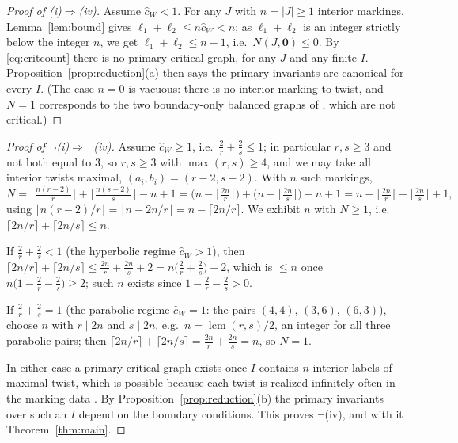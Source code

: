 \documentclass[11pt]{amsart}
\theoremstyle{definition}
\theoremstyle{remark}
\newcommand{\chat}{\hat{c}}
\begin{document}
\begin{proof}[Proof of (i)$\Rightarrow$(iv)]
Assume $\chat_{W}<1$. For any $J$ with $n=|J|\geq1$ interior markings,
Lemma~\ref{lem:bound} gives $\ell_{1}+\ell_{2}\leq n\chat_{W}<n$; as
$\ell_{1}+\ell_{2}$ is an integer strictly below the integer $n$, we get
$\ell_{1}+\ell_{2}\leq n-1$, i.e.\ $N(J,\mathbf 0)\leq0$. By
\eqref{eq:critcount} there is no primary critical graph, for any $J$ and any
finite $I$. Proposition~\ref{prop:reduction}(a) then says the primary invariants
are canonical for every $I$. (The case $n=0$ is vacuous: there is no interior
marking to twist, and $N=1$ corresponds to the two boundary-only balanced graphs
of \cite[Example~3.4]{GKT}, which are not critical.)
\end{proof}

\begin{proof}[Proof of $\neg$(i)$\Rightarrow\neg$(iv)]
Assume $\chat_{W}\geq1$, i.e.\ $\frac2r+\frac2s\leq1$; in particular
$r,s\geq3$ and not both equal to $3$, so $r,s\geq3$ with $\max(r,s)\geq4$, and
we may take all interior twists maximal, $(a_{i},b_{i})=(r-2,s-2)$. With $n$ such
markings,
\begin{equation}
\label{eq:maxN}
N=\Big\lfloor\tfrac{n(r-2)}{r}\Big\rfloor+\Big\lfloor\tfrac{n(s-2)}{s}\Big\rfloor-n+1
=\Big(n-\big\lceil\tfrac{2n}{r}\big\rceil\Big)
+\Big(n-\big\lceil\tfrac{2n}{s}\big\rceil\Big)-n+1
=n-\big\lceil\tfrac{2n}{r}\big\rceil-\big\lceil\tfrac{2n}{s}\big\rceil+1,
\end{equation}
using $\lfloor n(r-2)/r\rfloor=\lfloor n-2n/r\rfloor=n-\lceil2n/r\rceil$. We
exhibit $n$ with $N\geq1$, i.e.\ $\lceil2n/r\rceil+\lceil2n/s\rceil\leq n$.

If $\frac2r+\frac2s<1$ (the hyperbolic regime $\chat_{W}>1$), then
$\lceil2n/r\rceil+\lceil2n/s\rceil\leq\frac{2n}{r}+\frac{2n}{s}+2
=n\bigl(\frac2r+\frac2s\bigr)+2$, which is $\leq n$ once
$n\bigl(1-\frac2r-\frac2s\bigr)\geq2$; such $n$ exists since
$1-\frac2r-\frac2s>0$.

If $\frac2r+\frac2s=1$ (the parabolic regime $\chat_{W}=1$: the pairs $(4,4)$,
$(3,6)$, $(6,3)$), choose $n$ with $r\mid2n$ and $s\mid2n$, e.g.\
$n=\operatorname{lcm}(r,s)/2$, an integer for all three parabolic pairs; then
$\lceil2n/r\rceil+\lceil2n/s\rceil=\frac{2n}{r}+\frac{2n}{s}=n$,
so $N=1$.

In either case a primary critical graph exists once $I$ contains $n$ interior
labels of maximal twist, which is possible because each twist is realized
infinitely often in the marking data \cite[\S2.4]{GKT}. By
Proposition~\ref{prop:reduction}(b) the primary invariants over such an $I$
depend on the boundary conditions. This proves $\neg$(iv), and with it
Theorem~\ref{thm:main}.
\end{proof}
\end{document}
